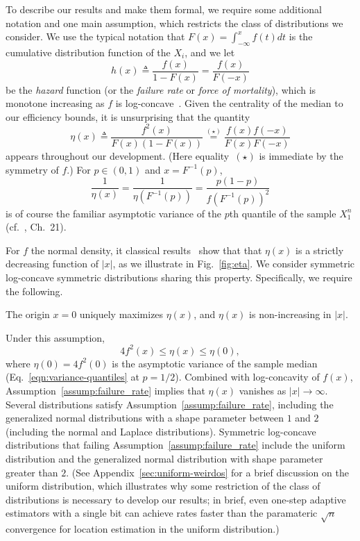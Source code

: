 To describe our results and make them formal, we require some additional
notation and one main assumption, which restricts the class of distributions
we consider.  We use the typical notation that
$F(x) = \int_{-\infty}^x f(t) dt$ is the cumulative distribution function
of the $X_i$, and we let
\begin{equation*}
  h(x) \triangleq \frac{f(x)}{1-F(x)} = \frac{f(x)}{F(-x)}
\end{equation*}
be the \emph{hazard} function (or the \emph{failure rate} or \emph{force of
  mortality}), which is monotone increasing as $f$ is
log-concave~\cite{bagnoli2005log}. Given the centrality of the median
to our efficiency bounds, it is unsurprising that the quantity
\begin{equation}
  \label{eq:eta_def}
  \eta(x) \triangleq \frac{f^2(x)}{F(x)(1-F(x))}
  \stackrel{(\star)}{=} \frac{f(x)f(-x)}{F(x)F(-x)}
\end{equation}
appears throughout our development. (Here equality~$(\star)$ is immediate by
the symmetry of $f$.)  For $p \in (0, 1)$ and $x = F^{-1}(p)$,
\begin{equation}
  \label{eqn:variance-quantiles}
  \frac{1}{\eta(x)} =
  \frac{1}{\eta(F^{-1}(p))}
  = \frac{p (1 - p)}{f(F^{-1}(p))^2}
\end{equation}
is of course the familiar asymptotic variance of the $p$th quantile of the
sample $X_1^n$ (cf.~\cite{VanDerVaart98}, Ch.~21).

For $f$ the normal density, it classical results~\cite{Samford1953,
  hammersley1950estimating} show that that $\eta(x)$ is a strictly
decreasing function of $|x|$, as we illustrate in Fig.~\ref{fig:eta}.
%
We consider symmetric log-concave symmetric distributions sharing this
property.  Specifically, we require the following.
\begin{assumption} \label{assump:failure_rate}
  The origin $x = 0$ uniquely maximizes $\eta(x)$, and $\eta(x)$ is
  non-increasing in $|x|$.
\end{assumption}
Under this assumption,
\begin{equation*}
  4 f^2(x) \leq \eta(x) \leq \eta(0),
\end{equation*} 
%
where $\eta(0) = 4 f^2(0)$ is the asymptotic variance of the sample median
(Eq.~\eqref{eqn:variance-quantiles} at $p = 1/2$).  Combined with
log-concavity of $f(x)$, Assumption~\ref{assump:failure_rate} implies that
$\eta(x)$ vanishes as $|x|\rightarrow \infty$.  Several distributions
satisfy Assumption~\ref{assump:failure_rate}, including the generalized
normal distributions with a shape parameter between $1$ and $2$ (including
the normal and Laplace distributions). Symmetric log-concave distributions
that failing Assumption~\ref{assump:failure_rate} include the uniform
distribution and the generalized normal distribution with shape parameter
greater than $2$. (See Appendix~\ref{sec:uniform-weirdos} for
a brief discussion on the uniform distribution, which illustrates
why some restriction of the class of distributions is necessary to
develop our results; in brief, even one-step adaptive estimators
with a single bit can achieve rates faster than the paramateric
$\sqrt{n}$ convergence for location estimation in the uniform distribution.)

